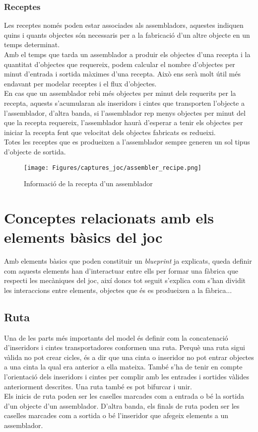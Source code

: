 \subsubsection{Receptes} \label{subsec:recipes}
Les receptes només poden estar associades als assembladors, aquestes indiquen quins i quants objectes són necessaris per a la fabricació d'un altre objecte en un temps determinat.\\
Amb el temps que tarda un assemblador a produir els objectes d'una recepta i la quantitat d'objectes que requereix, podem calcular el nombre d'objectes per minut d'entrada i sortida màximes d'una recepta. Això ens serà molt útil més endavant per modelar receptes i el flux d'objectes.\\
En cas que un assemblador rebi més objectes per minut dels requerits per la recepta, aquests s'acumularan als inseridors i cintes que transporten l'objecte a l'assemblador, d'altra banda, si l'assemblador rep menys objectes per minut del que la recepta requereix, l'assemblador haurà d'esperar a tenir els objectes per iniciar la recepta fent que velocitat dels objectes fabricats es redueixi.\\
Totes les receptes que es produeixen a l'assemblador sempre generen un sol tipus d'objecte de sortida.

\begin{figure}[H]
    \centering
    \texttt{[image: Figures/captures\_joc/assembler\_recipe.png]}
    \caption{Informació de la recepta d'un assemblador}
    \label{fig:assembler_recipe}
\end{figure}

\section{Conceptes relacionats amb els elements bàsics del joc}
Amb elements bàsics que poden constituir un \textit{blueprint} ja explicats, queda definir com aquests elements han d'interactuar entre ells per formar una fàbrica que respecti les mecàniques del joc, així doncs tot seguit s'explica com s'han dividit les interaccions entre elements, objectes que és es produeixen a la fàbrica...

\subsection{Ruta}
Una de les parts més importants del model és definir com la concatenació d'inseridors i cintes transportadores conformen una ruta. Perquè una ruta sigui vàlida no pot crear cicles, és a dir que una cinta o inseridor no pot entrar objectes a una cinta la qual era anterior a ella mateixa. També s'ha de tenir en compte l'orientació dels inseridors i cintes per complir amb les entrades i sortides vàlides anteriorment descrites. Una ruta també es pot bifurcar i unir.\\
Els inicis de ruta poden ser les caselles marcades com a entrada o bé la sortida d'un objecte d'un assemblador. D'altra banda, els finals de ruta poden ser les caselles marcades com a sortida o bé l'inseridor que afegeix elements a un assemblador.

